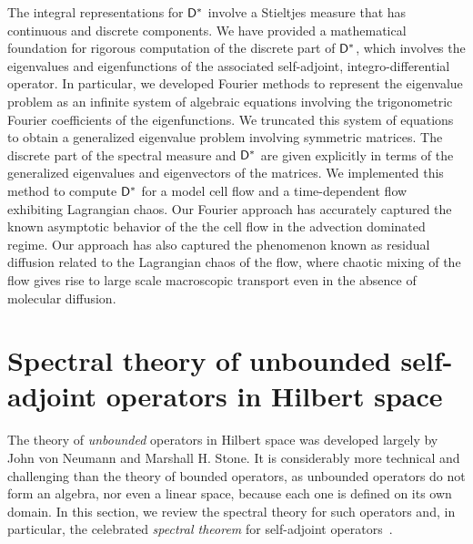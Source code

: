 \documentclass[amsa]{ipart}
\begin{document}
The integral representations for $\mathsf{D}^*$ involve a Stieltjes measure
that has continuous and discrete components. We have provided a
mathematical foundation for rigorous computation of the discrete part
of $\mathsf{D}^*$, which involves the eigenvalues and eigenfunctions  of the
associated self-adjoint, integro-differential operator. In particular,
we developed Fourier 
methods to represent the eigenvalue problem as an infinite system of
algebraic equations involving the trigonometric Fourier coefficients
of the eigenfunctions. We truncated this system of equations to obtain
a generalized eigenvalue problem involving symmetric matrices. The
discrete part of the spectral 
measure and $\mathsf{D}^*$ are given explicitly in terms of the generalized
eigenvalues and eigenvectors of the matrices. We implemented this
method to compute 
$\mathsf{D}^*$ for a model cell flow and a time-dependent flow exhibiting
Lagrangian chaos. Our Fourier approach has accurately captured the
known asymptotic behavior of the the cell flow in the advection
dominated regime. Our approach has also captured the phenomenon known
as residual diffusion related to the Lagrangian chaos of the flow,
where chaotic mixing of the flow gives rise to large scale macroscopic
transport even in the absence of molecular diffusion. 





  \setcounter{equation}{1}  %
  \setcounter{section}{0}  %
  \renewcommand{\theequation}{A-\arabic{equation}} 
\renewcommand{\thesection}{A-\arabic{section}}

\appendix
%

\section{Spectral theory of unbounded self-adjoint operators in
  Hilbert space} \label{app:Spectral_Theory}    
%
The theory of \emph{unbounded} operators in Hilbert
space was developed largely by John von Neumann and Marshall H. Stone. It
is considerably more technical and challenging than the theory of bounded
operators, as unbounded operators do not form an algebra, nor even a
linear space, because each one is defined on its own domain. In this
section, we review the spectral theory for such operators and, in
particular, the celebrated \emph{spectral theorem} for self-adjoint
operators~\cite{Reed-1980,Stone:64}.
\end{document}

